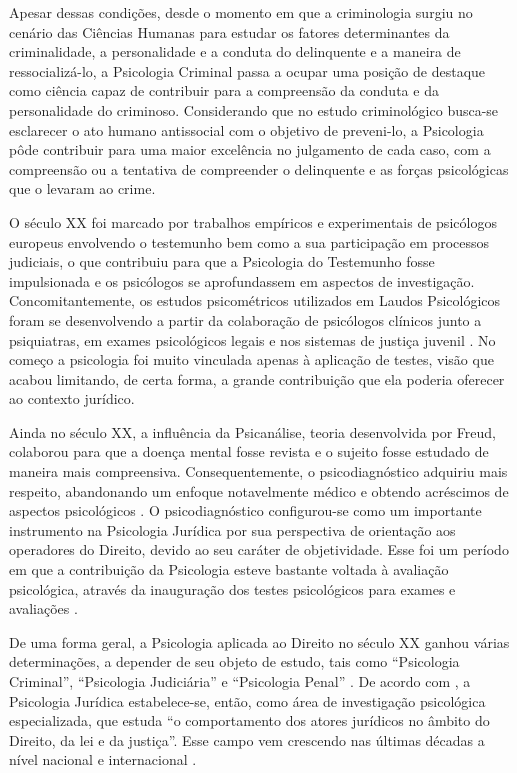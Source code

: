 Apesar dessas condições, desde o momento em que a criminologia surgiu no cenário das Ciências Humanas para estudar os fatores determinantes da criminalidade, a personalidade e a conduta do delinquente e a maneira de ressocializá-lo, a Psicologia Criminal passa a ocupar uma posição de destaque como ciência capaz de contribuir para a compreensão da conduta e da personalidade do criminoso. Considerando que no estudo criminológico busca-se esclarecer o ato humano antissocial com o objetivo de preveni-lo, a Psicologia pôde contribuir para uma maior excelência no julgamento de cada caso, com a compreensão ou a tentativa de compreender o delinquente e as forças psicológicas que o levaram ao crime.

O século XX foi marcado por trabalhos empíricos e experimentais de psicólogos europeus envolvendo o testemunho bem como a sua participação em processos judiciais, o que contribuiu para que a Psicologia do Testemunho fosse impulsionada e os psicólogos se aprofundassem em aspectos de investigação. Concomitantemente, os estudos psicométricos utilizados em Laudos Psicológicos foram se desenvolvendo a partir da colaboração de psicólogos clínicos junto a psiquiatras, em exames psicológicos legais e nos sistemas de justiça juvenil \cite{JESUS2001}. No começo a psicologia foi muito vinculada apenas à aplicação de testes, visão que acabou limitando, de certa forma, a grande contribuição que ela poderia oferecer ao contexto jurídico.

Ainda no século XX, a influência da Psicanálise, teoria desenvolvida por Freud, colaborou para que a doença mental fosse revista e o sujeito fosse estudado de maneira mais compreensiva. Consequentemente, o psicodiagnóstico adquiriu mais respeito, abandonando um enfoque notavelmente médico e obtendo acréscimos de aspectos psicológicos . O psicodiagnóstico configurou-se como um importante instrumento na Psicologia Jurídica por sua perspectiva de orientação aos operadores do Direito, devido ao seu caráter de objetividade. Esse foi um período em que a contribuição da Psicologia esteve bastante voltada à avaliação psicológica, através da inauguração dos testes psicológicos para exames e avaliações \cite{LAGO2009}.

De uma forma geral, a Psicologia aplicada ao Direito no século XX ganhou várias determinações, a depender de seu objeto de estudo, tais como ``Psicologia Criminal'', ``Psicologia Judiciária'' e ``Psicologia Penal'' \cite[p. 234]{COSTA2009}. De acordo com , a Psicologia Jurídica estabelece-se, então, como área de investigação psicológica especializada, que estuda ``o comportamento dos atores jurídicos no âmbito do Direito, da lei e da justiça''. Esse campo vem crescendo nas últimas décadas a nível nacional e internacional \cite{LEAL2008}.

